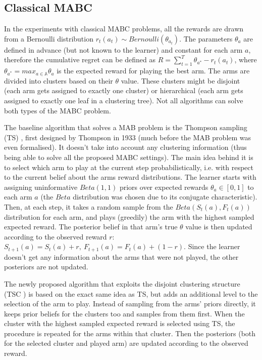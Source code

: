 \subsection{Classical MABC}

In the experiments with classical MABC problems, all the rewards are drawn from a Bernoulli distribution $r_t(a_t) \sim Bernoulli(\theta_{a_t})$. The parameters $\theta_a$ are defined in advance (but not known to the learner) and constant for each arm $a$, therefore the cumulative regret can be defined as $R = \sum_{t=1}^{T} \theta_{a^*} - r_t(a_t)$, where $\theta_{a^*} = max_{a \in \mathbb{A}} \theta_a$ is the expected reward for playing the best arm. The arms are divided into clusters based on their $\theta$ value. These clusters might be disjoint (each arm gets assigned to exactly one cluster) or hierarchical (each arm gets assigned to exactly one leaf in a clustering tree). Not all algorithms can solve both types of the MABC problem.

The baseline algorithm that solves a MAB problem is the Thompson sampling (TS) \cite{thompson}, first designed by Thompson in 1933 (much before the MAB problem was even formalised). It doesn't take into account any clustering information (thus being able to solve all the proposed MABC settings). The main idea behind it is to select which arm to play at the current step probabilistically, i.e. with respect to the current belief about the arms reward distributions. The learner starts with assigning uninformative $Beta(1, 1)$ priors over expected rewards $\theta_a \in [0, 1]$ to each arm $a$ (the $Beta$ distribution was chosen due to its conjugate characteristic). Then, at each step, it takes a random sample from the $Beta(S_t(a), F_t(a))$ distribution for each arm, and plays (greedily) the arm with the highest sampled expected reward. The posterior belief in that arm's true $\theta$ value is then updated according to the observed reward $r$: $S_{t+1}(a) = S_t(a) + r,\ F_{t+1}(a) = F_t(a) + (1 - r)$. Since the learner doesn't get any information about the arms that were not played, the other posteriors are not updated.

The newly proposed algorithm that exploits the disjoint clustering structure (TSC \cite{bandits}) is based on the exact same idea as TS, but adds an additional level to the selection of the arm to play. Instead of sampling from the arms' priors directly, it keeps prior beliefs for the clusters too and samples from them first. When the cluster with the highest sampled expected reward is selected using TS, the procedure is repeated for the arms within that cluster. Then the posteriors (both for the selected cluster and played arm) are updated according to the observed reward. 

